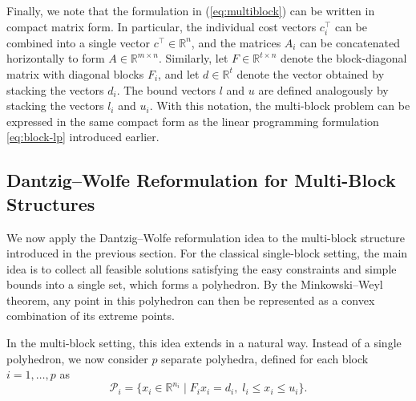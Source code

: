 \documentclass{book}
\theoremstyle{definition}
\numberwithin{algorithm_}{chapter}
\begin{document}
\bigskip

Finally, we note that the formulation in (\ref{eq:multiblock}) can be written in compact matrix form. 
In particular, the individual cost vectors $c_i^\top$ can be combined into a single vector $c^\top \in \mathbb{R}^n$, and the 
matrices $A_i$ can be concatenated horizontally to form $A \in \mathbb{R}^{m \times n}$. Similarly, let 
$F \in \mathbb{R}^{t \times n}$ denote the block-diagonal matrix with diagonal blocks $F_i$, and let $d \in \mathbb{R}^{t}$ denote 
the vector obtained by stacking the vectors $d_i$. The bound vectors $l$ and $u$ are defined analogously by stacking the vectors 
$l_i$ and $u_i$. With this notation, the multi-block problem can be expressed in the same compact form as the linear programming 
formulation \eqref{eq:block-lp} introduced earlier.

\newpage


\subsection{Dantzig--Wolfe Reformulation for Multi-Block Structures}

We now apply the Dantzig--Wolfe reformulation idea to the multi-block structure introduced in the previous section.
For the classical single-block setting, the main idea is to collect all feasible solutions satisfying the easy constraints and simple bounds into a single set, which forms a polyhedron. By the Minkowski--Weyl theorem, any point in this polyhedron can then be represented as a convex combination of its extreme points.

\bigskip

In the multi-block setting, this idea extends in a natural way. Instead of a single polyhedron, we now consider $p$ separate polyhedra, defined for each block $i = 1,\dots,p$ as
\begin{equation}
\mathcal{P}_i = \{ x_i \in \mathbb{R}^{n_i} \mid F_i x_i = d_i,\; l_i \le x_i \le u_i \}.
\end{equation}
\end{document}
